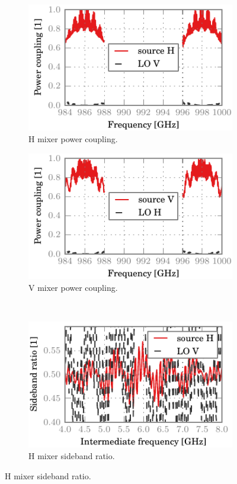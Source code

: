 \begin{figure}[hbtp]
    \centering
    \begin{subfigure}[b]{.5\textwidth}
        \includegraphics{chapter_3/15_everything_h_dsb}%
        \caption{H mixer power coupling.}
    \end{subfigure}%
    \begin{subfigure}[b]{.5\textwidth}
        \includegraphics{chapter_3/15_everything_v_dsb}%
        \caption{V mixer power coupling.}
    \end{subfigure}%
    \\
    \begin{subfigure}[b]{.5\textwidth}
        \includegraphics{chapter_3/15_everything_h_sbr}%
        \caption{H mixer sideband ratio.}
    \end{subfigure}%

\end{figure}
